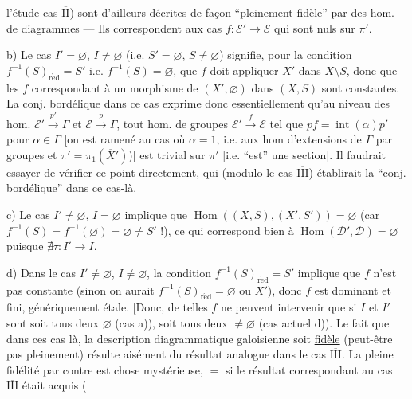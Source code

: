 

l'étude  cas \uline{$\overline{\mathrm{II}}$}) sont d'ailleurs décrites de façon ``pleinement fidèle'' par des hom. de diagrammes --- Ils correspondent aux cas $f:\mathcal E'\to\mathcal E$ qui sont nuls sur $\pi'$.

b) Le cas $I'=\varnothing$, $I\ne\varnothing$ (i.e. $S'=\varnothing$, $S\ne\varnothing$) signifie, pour la condition $f^{-1}(S)_{\mathrm{r\acute ed}}=S'$ i.e. $f^{-1}(S)=\varnothing$, que $f$ doit appliquer $X'$ dans $X\setminus S$,  donc que les $f$ correspondant à un morphisme de $(X',\varnothing)$ dans $(X,S)$ sont constantes.
La conj. bordélique dans ce cas exprime donc  essentiellement qu'au niveau des hom. $\mathcal E'\xrightarrow{p'}\Gamma$ et $\mathcal E\xrightarrow{p}\Gamma$, tout hom. de groupes $\mathcal E'\xrightarrow{f}\mathcal E$ tel que $pf=\operatorname{int}(\alpha)p'$ pour $\alpha\in\Gamma$ [on est ramené au cas où $\alpha=1$,  i.e. aux hom d'extensions de $\Gamma$ par  groupes  et $\pi'=\pi_1(\overline X')$)] est trivial sur $\pi'$ [i.e. ``est'' une section]. Il faudrait essayer de vérifier ce point directement, qui (modulo le cas \uline{$\overline{\mathrm{III}}$}) établirait la ``conj. bordélique'' dans ce cas-là.



c) Le cas $I'\ne\varnothing$, $I=\varnothing$ implique que $\operatorname{Hom}((X,S),(X',S'))=\varnothing$ (car $f^{-1}(S)=f^{-1}(\varnothing)=\varnothing\ne S'$ !), ce qui correspond bien  à $\operatorname{Hom}(\mathcal D',\mathcal D)=\varnothing$ puisque $\nexists\tau:I'\to I$.

d) Dans le cas $I'\ne\varnothing$, $I\ne\varnothing$, la condition $f^{-1}(S)_{\mathrm{r\acute ed}}=S'$ implique que $f$ n'est pas constante (sinon on aurait $f^{-1}(S)_{\mathrm{r\acute ed}}=\varnothing$ ou $X'$), donc $f$ est dominant et fini, génériquement étale. [Donc, de telles $f$ ne  peuvent intervenir que si $I$ et $I'$ sont soit tous deux $\varnothing$ (cas a)), soit tous deux $\ne\varnothing$ (cas actuel d)). Le fait que dans ces cas là, la description diagrammatique galoisienne soit \uline{fidèle} (peut-être pas pleinement) résulte aisément du résultat analogue dans le cas \uline{$\overline{\mathrm{III}}$}.
La pleine fidélité par contre est chose mystérieuse, $=$ si le résultat correspondant   au cas \uline{$\overline{\mathrm{III}}$} était acquis (

